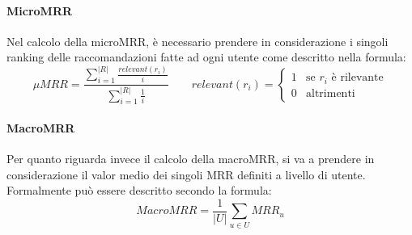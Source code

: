 \paragraph{MicroMRR}
Nel calcolo della microMRR, è necessario prendere in considerazione i singoli ranking delle raccomandazioni fatte ad ogni utente come descritto nella formula:
\begin{equation*}
\mu MRR =\frac{\sum\limits_{i=1}^{|R|}{\frac{relevant(r_i)}{i}}}{\sum\limits_{i=1}^{|R|}{\frac{1}{i}}} \qquad relevant(r_i)=\begin{cases} 1 & \mbox{se }r_i\mbox{ è rilevante} \\ 0 & \mbox{altrimenti}
\end{cases}
\end{equation*}
\paragraph{MacroMRR}
Per quanto riguarda invece il calcolo della macroMRR, si va a prendere in considerazione il valor medio dei singoli MRR definiti a livello di utente. Formalmente può essere descritto secondo la formula:
\begin{equation*}
MacroMRR =\frac{1}{|U|}\sum_{u\in U}{MRR_u}
\end{equation*}

